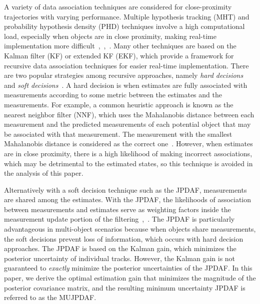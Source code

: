 \documentclass[letterpaper, 10pt, conference]{ieeeconf}
\begin{document}
A variety of data association techniques are considered for close-proximity trajectories with varying performance.
Multiple hypothesis tracking (MHT) and probability hypothesis density (PHD) techniques involve a high computational load, especially when objects are in close proximity, making real-time implementation more difficult~\cite{MHT1},~\cite{PHD1},~\cite{PHD2}.
Many other techniques are based on the Kalman filter (KF) or extended KF (EKF), which provide a framework for recursive data association techniques for easier real-time implementation.
There are two popular strategies among recursive approaches, namely \emph{hard decisions} and \emph{soft decisions}~\cite{JPDAF1}.
A hard decision is when estimates are fully associated with measurements according to some metric between the estimates and the measurements.
For example, a common heuristic approach is known as the nearest neighbor filter (NNF), which uses the Mahalanobis distance between each measurement and the predicted measurements of each potential object that may be associated with that measurement.
The measurement with the smallest Mahalanobis distance is considered as the correct one~\cite{NN2}.
However, when estimates are in close proximity, there is a high likelihood of making incorrect associations, which may be detrimental to the estimated states, so this technique is avoided in the analysis of this paper.

Alternatively with a soft decision technique such as the JPDAF, measurements are shared among the estimates. With the JPDAF, the likelihoods of association between measurements and estimates serve as weighting factors inside the measurement update portion of the filtering~\cite{JPDAF1},~\cite{TrackDataAssoc}.
The JPDAF is particularly advantageous in multi-object scenarios because when objects share measurements, the soft decisions prevent loss of information, which occurs with hard decision approaches.
The JPDAF is based on the Kalman gain, which minimizes the posterior uncertainty of individual tracks.
However, the Kalman gain is not guaranteed to \emph{exactly} minimize the posterior uncertainties of the JPDAF.
In this paper, we derive the optimal estimation gain that minimizes the magnitude of the posterior covariance matrix, and the resulting minimum uncertainty JPDAF is referred to as the MUJPDAF.
\end{document}
